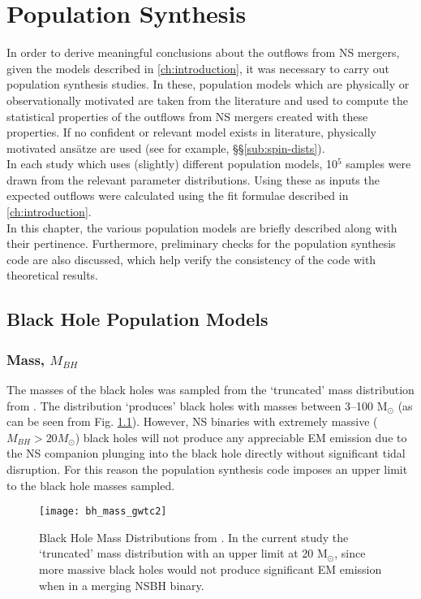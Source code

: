 \chapter{Population Synthesis}\label{ch:synthesis}
    In order to derive meaningful conclusions about the outflows from NS mergers, given
    the models described in \ref{ch:introduction}, it was necessary to carry out
    population synthesis studies. In these, population models which are physically or
    observationally motivated are taken from the literature and used to compute the
    statistical properties of the outflows from NS mergers created with these
    properties. If no confident or relevant model exists in literature, physically
    motivated ans\"{a}tze are used (see for example, \S\S\ref{sub:spin-dists}).\\
    In each study which uses (slightly) different population models, 10$^5$ samples were
    drawn from the relevant parameter distributions. Using these as inputs the expected
    outflows were calculated using the fit formulae described in
    \ref{ch:introduction}.\\
    In this chapter, the various population models are briefly described along with
    their pertinence. Furthermore, preliminary checks for the population synthesis code
    are also discussed, which help verify the consistency of the code with theoretical
    results.

\section{Black Hole Population Models}\label{sec:bh_pop}

    \subsection{Mass, $M_{BH}$}
        The masses of the black holes was sampled from the `truncated' mass distribution
        from \cite{abbott_2020B}. The distribution `produces' black holes with masses
        between 3--100 M$_\odot$ (as can be seen from Fig.  \ref{fig:bh_mass_gwtc2}).
        However, NS binaries with extremely massive ($M_{BH} > 20 M_\odot$) black holes
        will not produce any appreciable EM emission due to the NS companion plunging
        into the black hole directly without significant tidal disruption. For this
        reason the population synthesis code imposes an upper limit to the black hole
        masses sampled.

        \begin{figure}[H]
            \centering
            \texttt{[image: bh\_mass\_gwtc2]}
            \caption[Black hole mass distributions from GWTC-2]{
                Black Hole Mass Distributions from \cite{abbott_2020B}. In the current
                study the `truncated' mass distribution with an upper limit at 20
                M$_\odot$, since more massive black holes would not produce significant
                EM emission when in a merging NSBH binary.
            }
            \label{fig:bh_mass_gwtc2}
        \end{figure}

